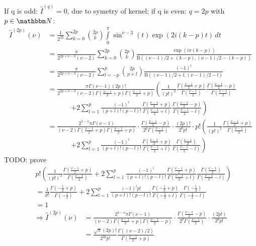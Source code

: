 \documentclass[
  english,		%
  a4paper,		%
  11pt,			%
  DIV=12,
  titlepage,
  toc=bibnumbered,
  parskip=full,  	%
  headings=normal,
  BCOR=12mm,
  numbers=noenddot
]{scrartcl}
\begin{document}
If q is odd: $\hat I^{(q)}=0$, due to symetry of kernel; if q is even: $q=2p$ with $p\in\mathbbm N$:
\begin{align}
\hat I^{(2p)}(\nu) &= \frac 1 {2^{2p}}\sum\limits_{k=0}^{2p} \binom{2p}{k} \int\limits_0^\pi\sin^{\nu-3}(t)\exp(2i(k-p)t)\,dt\\
 &= \frac \pi{2^{2p+\nu-3} (\nu-2)}\sum\limits_{k=0}^{2p} \binom{2p}{k}\frac{\exp(i\pi(k-p))}{\mathrm{B}((\nu-1)/2+(k-p),(\nu-1)/2-(k-p))}\\
 &= \frac \pi{2^{2p+\nu-3} (\nu-2)}\sum\limits_{l=-p}^{p} \binom{2p}{p+l}\frac{(-1)^l}{\mathrm{B}((\nu-1)/2+l,(\nu-1)/2-l)}\\
 &= \frac {\pi\Gamma(\nu-1)(2p)!}{2^{2p+\nu-3} (\nu-2)\Gamma(\frac{n-1} 2+p)\Gamma(\frac{n-1} 2+p)}\left(\frac 1 {(p!)^2} \frac{\Gamma(\frac{\nu-1} 2+p)}{\Gamma(\frac{\nu-1} 2)}\frac{\Gamma(\frac{\nu-1} 2-p)}{\Gamma(\frac{\nu-1} 2)} \right. \nonumber\\
 &\hspace{40pt}\left. + 2\sum\limits_{l=1}^{p}\frac{(-1)^l}{(p+l)!(p-l)!}\frac{\Gamma(\frac{\nu-1} 2+p)}{\Gamma(\frac{\nu-1} 2+l)}\frac{\Gamma(\frac{\nu-1} 2-p)}{\Gamma(\frac{\nu-1} 2-l)}\right)\\
 &= \frac {2^{3-\nu}\pi\Gamma(\nu-1)}{(\nu-2)\Gamma(\frac{n-1} 2+p)\Gamma(\frac{n-1} 2+p)}\cdot \frac{\Gamma(\frac{\nu-1} 2-p)}{2^{p}\Gamma(\frac{\nu-1} 2)} \cdot \frac{(2p)!}{2^p p!} \cdot p! \left(\frac 1 {(p!)^2} \frac{\Gamma(\frac{\nu-1} 2+p)}{\Gamma(\frac{\nu-1} 2)} \right. \nonumber\\
 &\hspace{40pt}\left. + 2\sum\limits_{l=1}^{p}\frac{(-1)^l}{(p+l)!(p-l)!}\frac{\Gamma(\frac{\nu-1} 2+p)}{\Gamma(\frac{\nu-1} 2+l)}\frac{\Gamma(\frac{\nu-1} 2)}{\Gamma(\frac{\nu-1} 2-l)}\right)
\end{align}
TODO: prove 
\begin{align}
&p! \left(\frac 1 {(p!)^2} \frac{\Gamma(\frac{\nu-1} 2+p)}{\Gamma(\frac{\nu-1} 2)} + 2\sum\limits_{l=1}^{p}\frac{(-1)^l}{(p+l)!(p-l)!}\frac{\Gamma(\frac{\nu-1} 2+p)}{\Gamma(\frac{\nu-1} 2+l)}\frac{\Gamma(\frac{\nu-1} 2)}{\Gamma(\frac{\nu-1} 2-l)}\right)\\
&= \frac {1} {p!}\frac{\Gamma(-\frac{1}2+p)}{\Gamma(-\frac{1}2)} + 2\sum\limits_{l=1}^{p}\frac{(-1)^l p!}{(p+l)!(p-l)!}\frac{\Gamma(-\frac{1} 2+p)}{\Gamma(-\frac{1} 2+l)}\frac{\Gamma(-\frac{1} 2)}{\Gamma(-\frac{1} 2-l)}\\
&= 1
\end{align}
\begin{align}
\Rightarrow \hat I^{(2p)}(\nu) &=\frac {2^{3-\nu}\pi\Gamma(\nu-1)}{(\nu-2)\Gamma(\frac{n-1} 2+p)\Gamma(\frac{n-1} 2-p)} \cdot \frac{\Gamma(\frac{\nu-1} 2-p)}{2^{p}\Gamma(\frac{\nu-1} 2)} \cdot \frac{(2p!)}{2^p p!}\\
 &= \frac{\sqrt{\pi}(2p)!}{2^{2p}p!} \frac {\Gamma((\nu-2)/2)} {\Gamma(\frac{\nu-1}2+p)}
\end{align}
\end{document}
